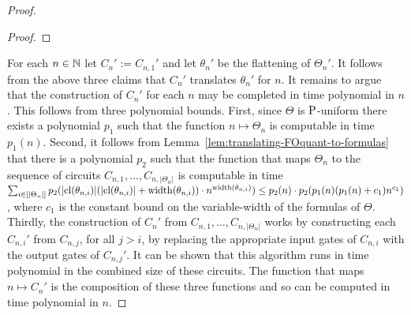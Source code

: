 \documentclass[../main/thesis.tex]{subfiles}
\begin{document}
\begin{proof}
\begin{proof}

\end{proof}

For each $n \in \mathbb{N}$ let $C_{n}' := C_{n, 1}'$ and let $\theta_n'$ be the
flattening of $\Theta_n'$. It follows from the above three claims that $C_n'$
translates $\theta_{n}'$ for $n$. It remains to argue that the construction of
$C_n'$ for each $n$ may be completed in time polynomial in $n$. This follows
from three polynomial bounds. First, since $\Theta$ is $\mathrm{P}$-uniform there
exists a polynomial $p_1$ such that the function $n \mapsto \Theta_n$ is
computable in time $p_1(n)$. Second, it follows from
Lemma~\ref{lem:translating-FOquant-to-formulas} that there is a polynomial $p_2$
such that the function that maps $\Theta_n$ to the sequence of circuits $C_{n,
  1}, \ldots, C_{n, \vert \Theta_n \vert}$ is computable in time $\sum_{i \in
  [\vert \Theta_n \vert]} p_2(\vert \mathrm{cl}(\theta_{n, i}) \vert (\vert
\mathrm{cl}(\theta_{n, i}) \vert + \mathrm{width}(\theta_{n, i})) \cdot n^{\mathrm{width}(\theta_{n,
      i})}) \leq p_2(n) \cdot p_2(p_1 (n) (p_1(n) + c_1) n^{c_1})$, where $c_1$
is the constant bound on the variable-width of the formulas of $\Theta$.
Thirdly, the construction of $C_n'$ from $C_{n, 1}, \ldots, C_{n, \vert \Theta_n
  \vert}$ works by constructing each $C_{n, i}'$ from $C_{n, j}$, for all $j >
i$, by replacing the appropriate input gates of $C_{n, i}$ with the output gates
of $C_{n, j}'$. It can be shown that this algorithm runs in time polynomial in
the combined size of these circuits. The function that maps $n \mapsto C_n'$ is
the composition of these three functions and so can be computed in time
polynomial in $n$.



\end{proof}
\end{document}
